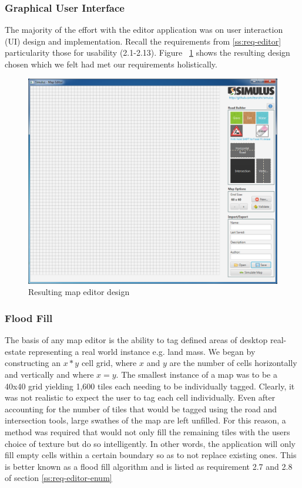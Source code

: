 \subsubsection{Graphical User Interface}
The majority of the effort with the editor application was on user interaction (UI) design and implementation. Recall the requirements from \ref{ss:req-editor} particularity those for usability (2.1-2.13). Figure ~\ref{fig:finalMapEditor} shows the resulting design chosen which we felt had met our requirements holistically.


\begin{figure}[h]
	\begin{center}
			\includegraphics[scale=0.45]{img/mapEditorFinal.png}
		\caption{Resulting map editor design}
		\label{fig:finalMapEditor}
	\end{center}
\end{figure}

\subsubsection{Flood Fill}
The basis of any map editor is the ability to tag defined areas of desktop real-estate representing a real world instance e.g. land mass. We began by constructing an $x*y$ cell grid, where $x$ and $y$ are the number of cells horizontally and vertically and where $x=y$. The smallest instance of a map was to be a 40x40 grid yielding 1,600 tiles each needing to be individually tagged. Clearly, it was not realistic to expect the user to tag each cell individually. Even after accounting for the number of tiles that would be tagged using the road and intersection tools, large swathes of the map are left unfilled.  
For this reason, a method was required that would not only fill the remaining tiles with the users choice of texture but do so intelligently. In other words, the application will only fill empty cells within a certain boundary so as to not replace existing ones. This is better known as a flood fill algorithm and is listed as requirement 2.7 and 2.8 of section \ref{ss:req-editor-enum}

